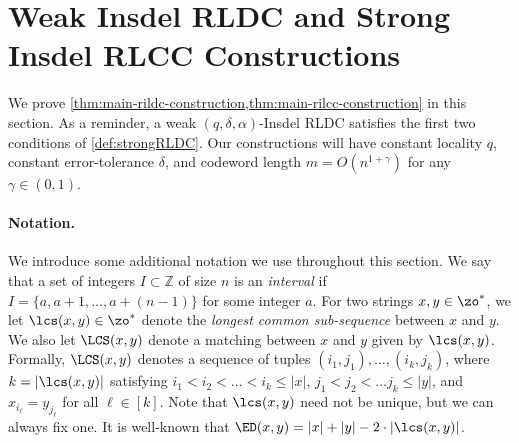 \section{Weak Insdel RLDC and Strong Insdel RLCC Constructions}\label{sec:wrLDC}
% 
We prove \cref{thm:main-rildc-construction,thm:main-rilcc-construction} in this section.
As a reminder, a weak $(q, \delta, \alpha)$-Insdel RLDC satisfies the first two conditions of \cref{def:strongRLDC}.
Our constructions will have constant locality $q$, constant error-tolerance $\delta$, and codeword length $m = O(n^{1+\gamma})$ for any $\gamma \in (0,1)$.

\paragraph{Notation.}
We introduce some additional notation we use throughout this section.
We say that a set of integers $I \subset \mathbb{Z}$ of size $n$ is an \emph{interval} if $I = \{a, a+1, \dotsc, a+(n-1)\}$ for some integer $a$.
For two strings $x, y \in \zo^*$, we let $\lcs(x,y) \in \zo^*$ denote the \emph{longest common sub-sequence} between $x$ and $y$. 
We also let $\LCS(x,y)$ denote a matching between $x$ and $y$ given by $\lcs(x,y)$. 
Formally, $\LCS(x,y)$ denotes a sequence of tuples $(i_1, j_1), \dotsc, (i_k, j_k)$, where $k = |\lcs(x,y)|$ satisfying $i_1 < i_2 < \dotsc < i_k \leq |x|$, $j_1 < j_2 < \dotsc j_k \leq |y|$, and $x_{i_\ell} = y_{j_\ell}$ for all $\ell \in [k]$.
Note that $\lcs(x,y)$ need not be unique, but we can always fix one.
It is well-known that $\ED(x,y) = |x| + |y| - 2 \cdot |\lcs(x,y)|$. 

